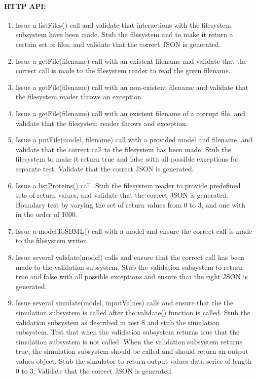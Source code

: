 \paragraph{HTTP API:
}\begin{enumerate}
\item Issue a listFiles() call and validate that interactions with the filesystem subsystem have been made. Stub the filesystem and to make it return a certain set of files, and validate that the correct JSON is generated.
\item Issue a getFile(filename) call with an existent filename and validate that the correct call is made to the filesystem reader to read the given filename.
\item Issue a getFile(filename) call with an non-existent filename and validate that the filesystem reader throws an exception.
\item Issue a getFile(filename) call with an existent filename of a corrupt file, and validate that the filesystem reader throws and exception.
\item Issue a putFile(model, filename) call with a provided model and filename, and validate  that the correct call to the filesystem has been made. Stub the filesystem to make it return true and false with all possible exceptions for separate test. Validate that the correct JSON is generated.\item Issue a listProteins() call. Stub the filesystem reader to provide predefined sets of return values, and validate that the correct JSON is generated. Boundary test by varying the set of return values from 0 to 3, and one with in the order of 1000. \item Issue a modelToSBML() call with a model and ensure the correct call is made to the filesystem writer.\item Issue several validate(model) calls and ensure that the correct call has been made to the validation subsystem. Stub the validation subsystem to return true and false with all possible exceptions and ensure that the right JSON is generated.
\item Issue several simulate(model, inputValues) calls and ensure that the the simulation subsystem is called after the validate() function is called. Stub the validation subsystem as described in test 8 and stub the simulation subsystem. Test that when the validation subsystem returns true that the simulation subsystem is not called. When the validation subsystem returns true, the simulation subsystem should be called and should return an output values object. Stub the simulator to return output values data series of length 0 to 3. Validate that the correct JSON is generated.\end{enumerate}
